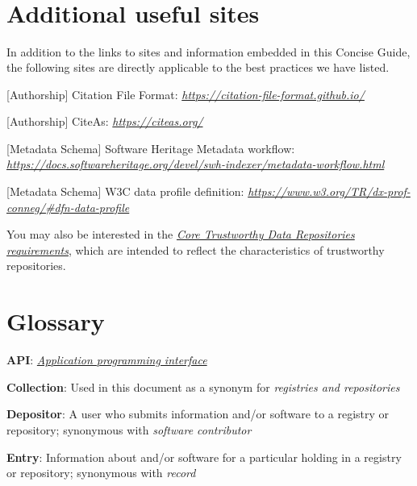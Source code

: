\documentclass[]{article}
\begin{document}
\section{\texorpdfstring{\\
}{ }}\label{section-11}

\newpage
\section{Additional useful sites }\label{additional-useful-sites}

In addition to the links to sites and information embedded in this
Concise Guide, the following sites are directly applicable to the best
practices we have listed.

{[}Authorship{]} Citation File Format:
\href{https://citation-file-format.github.io/}{\emph{https://citation-file-format.github.io/}}

{[}Authorship{]} CiteAs:
\href{https://citeas.org/}{\emph{https://citeas.org/}}

{[}Metadata Schema{]} Software Heritage Metadata workflow:
\href{https://docs.softwareheritage.org/devel/swh-indexer/metadata-workflow.html}{\emph{https://docs.softwareheritage.org/devel/swh-indexer/metadata-workflow.html}}

{[}Metadata Schema{]} W3C data profile definition:
\href{https://www.w3.org/TR/dx-prof-conneg/\#dfn-data-profile}{\emph{https://www.w3.org/TR/dx-prof-conneg/\#dfn-data-profile}}

You may also be interested in the
\href{https://www.coretrustseal.org/why-certification/requirements/}{\emph{Core
Trustworthy Data Repositories requirements}}, which are intended to
reflect the characteristics of trustworthy repositories.

\newpage
\section{Glossary}\label{glossary}

\textbf{API}: \href{https://en.wikipedia.org/wiki/API}{\emph{Application
programming interface}}

\textbf{Collection}: Used in this document as a synonym for
\emph{registries and repositories}

\textbf{Depositor}: A user who submits information and/or software to a
registry or repository; synonymous with \emph{software contributor}

\textbf{Entry}: Information about and/or software for a particular
holding in a registry or repository; synonymous with \emph{record}
\end{document}
